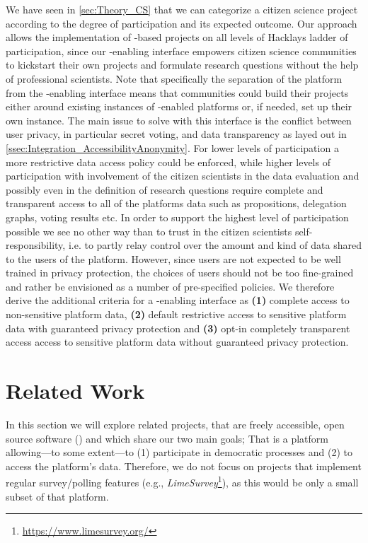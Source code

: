 We have seen in \ref{sec:Theory_CS} that we can categorize a citizen science project according to the degree of participation and its expected outcome.
Our approach allows the implementation of -based  projects on all levels of Hacklays ladder of participation, since our -enabling interface empowers citizen science communities to kickstart their own projects and formulate research questions without the help of professional scientists.
Note that specifically the separation of the  platform from the -enabling interface means that communities could build their  projects either around existing instances of -enabled  platforms or, if needed, set up their own instance.
The main issue to solve with this interface is the conflict between user privacy, in particular secret voting, and data transparency as layed out in \ref{ssec:Integration_AccessibilityAnonymity}.
For lower levels of participation a more restrictive data access policy could be enforced, while higher levels of participation with involvement of the citizen scientists in the data evaluation and possibly even in the definition of research questions require complete and transparent access to all of the platforms data such as propositions, delegation graphs, voting results etc.
In order to support the highest level of participation possible we see no other way than to trust in the citizen scientists self-responsibility, i.e. to partly relay control over the amount and kind of data shared to the users of the  platform.
However, since users are not expected to be well trained in privacy protection, the choices of users should not be too fine-grained and rather be envisioned as a number of pre-specified policies.
We therefore derive the additional criteria for a -enabling interface as \textbf{(1)} complete access to non-sensitive platform data, \textbf{(2)} default restrictive access to sensitive platform data with guaranteed privacy protection and \textbf{(3)} opt-in completely transparent access access to sensitive platform data without guaranteed privacy protection.

\section{Related Work}
\label{sec:RelatedWork}
  
In this section we will explore related projects, that are freely accessible, open source software () and which share our two main goals; That is a platform allowing---to some extent---to (1) participate in democratic processes and (2) to access the platform’s data. Therefore, we do not focus on projects that implement regular survey/polling features (e.g., \textit{LimeSurvey}\footnote{\url{https://www.limesurvey.org/}}), as this would be only a small subset of that platform.


